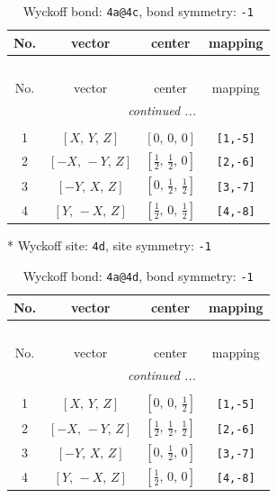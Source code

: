 \documentclass[fleqn,8pt]{jsarticle}
\begin{document}
\begin{longtable}{cccc}
\caption{Wyckoff bond: {\tt 4a@4c}, bond symmetry: {\tt -1}}
 \\
 \hline \hline
No. & vector & center & mapping \\ \hline \endfirsthead

\multicolumn{3}{l}{\tablename\ \thetable{}} \\
 \hline \hline
No. & vector & center & mapping \\ \hline \endhead

 \hline \hline
\multicolumn{3}{r}{\footnotesize\it continued ...} \\ \endfoot

 \hline \hline
\multicolumn{3}{r}{} \\ \endlastfoot

1 & $\left[ X,\, Y,\, Z \right]$ & $\left[ 0,\, 0,\, 0 \right]$ & {\tt [1,-5]} \\ \hline
2 & $\left[ - X,\, - Y,\, Z \right]$ & $\left[ \frac{1}{2},\, \frac{1}{2},\, 0 \right]$ & {\tt [2,-6]} \\ \hline
3 & $\left[ - Y,\, X,\, Z \right]$ & $\left[ 0,\, \frac{1}{2},\, \frac{1}{2} \right]$ & {\tt [3,-7]} \\ \hline
4 & $\left[ Y,\, - X,\, Z \right]$ & $\left[ \frac{1}{2},\, 0,\, \frac{1}{2} \right]$ & {\tt [4,-8]} \\
\end{longtable}
* Wyckoff site: {\tt 4d}, site symmetry: {\tt -1}
\renewcommand{\arraystretch}{1.2}
\begin{longtable}{cccc}
\caption{Wyckoff bond: {\tt 4a@4d}, bond symmetry: {\tt -1}}
 \\
 \hline \hline
No. & vector & center & mapping \\ \hline \endfirsthead

\multicolumn{3}{l}{\tablename\ \thetable{}} \\
 \hline \hline
No. & vector & center & mapping \\ \hline \endhead

 \hline \hline
\multicolumn{3}{r}{\footnotesize\it continued ...} \\ \endfoot

 \hline \hline
\multicolumn{3}{r}{} \\ \endlastfoot

1 & $\left[ X,\, Y,\, Z \right]$ & $\left[ 0,\, 0,\, \frac{1}{2} \right]$ & {\tt [1,-5]} \\ \hline
2 & $\left[ - X,\, - Y,\, Z \right]$ & $\left[ \frac{1}{2},\, \frac{1}{2},\, \frac{1}{2} \right]$ & {\tt [2,-6]} \\ \hline
3 & $\left[ - Y,\, X,\, Z \right]$ & $\left[ 0,\, \frac{1}{2},\, 0 \right]$ & {\tt [3,-7]} \\ \hline
4 & $\left[ Y,\, - X,\, Z \right]$ & $\left[ \frac{1}{2},\, 0,\, 0 \right]$ & {\tt [4,-8]} \\
\end{longtable}
\end{document}
